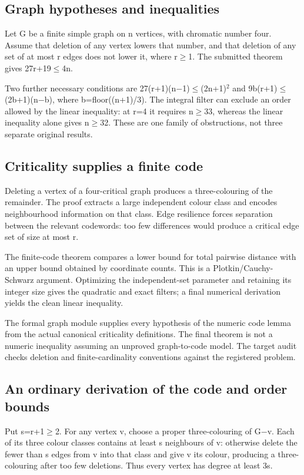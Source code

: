 \documentclass[11pt,a4paper]{article}
\begin{document}
\subsection{Graph hypotheses and inequalities}
Let G be a finite simple graph on n vertices, with chromatic number four. Assume that deletion of any vertex lowers that number, and that deletion of any set of at most r edges does not lower it, where r\ensuremath{\geq}1. The submitted theorem gives 27r+19\ensuremath{\leq}4n.

Two further necessary conditions are 27(r+1)(n\ensuremath{-}1)\ensuremath{\leq}(2n+1)\ensuremath{^2} and 9b(r+1)\ensuremath{\leq}(2b+1)(n\ensuremath{-}b), where b=floor((n+1)/3). The integral filter can exclude an order allowed by the linear inequality: at r=4 it requires n\ensuremath{\geq}33, whereas the linear inequality alone gives n\ensuremath{\geq}32. These are one family of obstructions, not three separate original results.

\subsection{Criticality supplies a finite code}
Deleting a vertex of a four-critical graph produces a three-colouring of the remainder. The proof extracts a large independent colour class and encodes neighbourhood information on that class. Edge resilience forces separation between the relevant codewords: too few differences would produce a critical edge set of size at most r.

The finite-code theorem compares a lower bound for total pairwise distance with an upper bound obtained by coordinate counts. This is a Plotkin/Cauchy-Schwarz argument. Optimizing the independent-set parameter and retaining its integer size gives the quadratic and exact filters; a final numerical derivation yields the clean linear inequality.

The formal graph module supplies every hypothesis of the numeric code lemma from the actual canonical criticality definitions. The final theorem is not a numeric inequality assuming an unproved graph-to-code model. The target audit checks deletion and finite-cardinality conventions against the registered problem.

\subsection{An ordinary derivation of the code and order bounds}
Put s=r+1\ensuremath{\geq}2. For any vertex v, choose a proper three-colouring of G\ensuremath{-}v. Each of its three colour classes contains at least s neighbours of v: otherwise delete the fewer than s edges from v into that class and give v its colour, producing a three-colouring after too few deletions. Thus every vertex has degree at least 3s.
\end{document}
